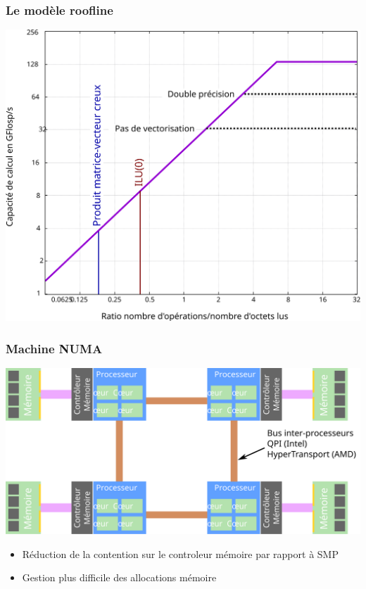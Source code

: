 \documentclass{beamer}
\begin{document}
\begin{frame}
  \frametitle{Le modèle roofline}
  \centerline{\includegraphics[width=0.8\linewidth]{roofline_rostand}}
\end{frame}


\begin{frame}
  \frametitle{Machine NUMA}
  \centerline{\includegraphics[width=0.8\linewidth]{numa}}

  \begin{itemize}
    \item Réduction de la contention sur le controleur mémoire par rapport à SMP
    \item Gestion plus difficile des allocations mémoire
  \end{itemize}

\end{frame}
\end{document}

